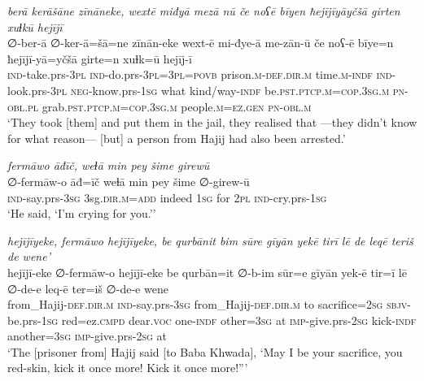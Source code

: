 \ea \label{BP.139}
\textit{berā kerāšāne zīnāneke, wextē miđyā mezā nū če noʕē bīyen ħejījīyāyčšā girten xuɫkū hejījī} \\ 
\gll ∅-ber-ā ∅-ker-ā=šā=ne zīnān-eke wext-ē mi-đye-ā me-zān-ū če noʕ-ē bīye=n ħejījī-yā=yčšā girte=n xuɫk=ū hejīj-ī \\ 
 \textsc{ind-}take.prs\textsc{-3pl} \textsc{ind-}do.prs\textsc{-3pl}\textsc{=3pl}\textsc{=\textsc{povb}} prison\textsc{.m}\textsc{-def}\textsc{.dir}\textsc{.m} time\textsc{.m}\textsc{-indf} \textsc{ind-}look.prs\textsc{-3pl} \textsc{neg-}know.prs\textsc{-\textsc{1sg}} what kind/way\textsc{-indf} be\textsc{.pst}\textsc{.ptcp}\textsc{.m}\textsc{=cop}\textsc{.3sg}\textsc{.m} \textsc{pn}\textsc{-obl}\textsc{.pl} grab\textsc{.pst}\textsc{.ptcp}\textsc{.m}\textsc{=cop}\textsc{.3sg}\textsc{.m} people\textsc{.m}\textsc{=ez.gen} \textsc{pn}\textsc{-obl}\textsc{.m} \\ 
\glt `They took [them] and put them in the jail, they realised that —they didn’t know for what reason— [but] a person from Hajij had also been arrested.'
\z 
 
\ea \label{BP.155}
\textit{fermāwo āđīč, weɫā min pey šime girewū} \\ 
\gll ∅-fermāw-o āđ=īč weɫā min pey šime ∅-girew-ū \\ 
 \textsc{ind-}say.prs\textsc{-3sg} 3sg\textsc{.dir}\textsc{.m}\textsc{=add} indeed \textsc{1sg} for \textsc{2pl} \textsc{ind-}cry.prs\textsc{-\textsc{1sg}} \\ 
\glt `He said, ‘I’m crying for you.’'
\z 
 
\ea \label{BP.172}
\textit{hejījīyeke, fermāwo hejījīyeke, be qurbānit bim sūre gīyān yekē tirī lē de leqē teriš de wene’} \\ 
\gll hejījī-eke ∅-fermāw-o hejījī-eke be qurbān=it ∅-b-im sūr=e gīyān yek-ē tir=ī lē ∅-de-e leq-ē ter=iš ∅-de-e wene \\ 
 from\_Hajij\textsc{-def}\textsc{.dir}\textsc{.m} \textsc{ind-}say.prs\textsc{-3sg} from\_Hajij\textsc{-def}\textsc{.dir}\textsc{.m} to sacrifice\textsc{=\textsc{2sg}} \textsc{sbjv-}be.prs\textsc{-\textsc{1sg}} red=ez\textsc{.cmpd} dear.\textsc{voc} one\textsc{-indf} other\textsc{=3sg} at \textsc{imp-}give.prs-\textsc{2sg} kick\textsc{-indf} another\textsc{=3sg} \textsc{imp-}give.prs-\textsc{2sg} at \\ 
\glt `The [prisoner from] Hajij said [to Baba Khwada], ‘May I be your sacrifice, you red-skin, kick it once more! Kick it once more!”'
\z 
 
